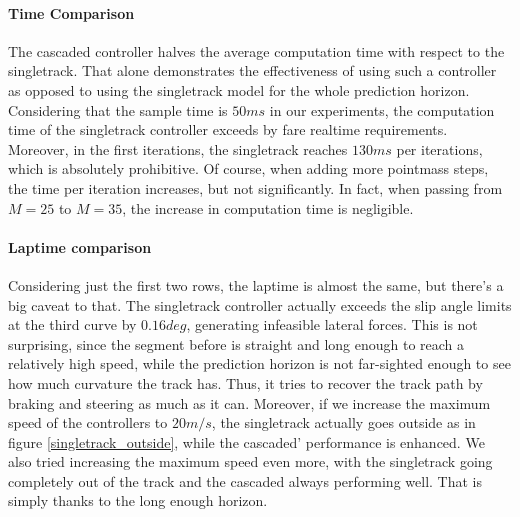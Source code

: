 \documentclass[a4paper, onecolumn, 12pt]{article}
\begin{document}
\paragraph{Time Comparison}
The cascaded controller halves the average computation time with respect to the
singletrack. That alone demonstrates the effectiveness of using such a
controller as opposed to using the singletrack model for the whole prediction
horizon. Considering that the sample time is $50ms$ in our experiments, the
computation time of the singletrack controller exceeds by fare realtime
requirements. Moreover, in the first iterations, the singletrack reaches $130ms$
per iterations, which is absolutely prohibitive. Of course, when adding more
pointmass steps, the time per iteration increases, but not significantly. In
fact, when passing from $M=25$ to $M=35$, the increase in computation time is
negligible.

\paragraph{Laptime comparison}
Considering just the first two rows, the laptime is almost the same, but there's
a big caveat to that. The singletrack controller actually exceeds the slip angle
limits at the third curve by $0.16 deg$, generating infeasible lateral forces.
This is not surprising, since the segment before is straight and long enough to
reach a relatively high speed, while the prediction horizon is not far-sighted
enough to see how much curvature the track has. Thus, it tries to recover the
track path by braking and steering as much as it can. Moreover, if we increase
the maximum speed of the controllers to $20 m/s$, the singletrack actually goes
outside as in figure \ref{singletrack_outside}, while the cascaded' performance
is enhanced. We also tried increasing the maximum speed even more, with the
singletrack going completely out of the track and the cascaded always performing
well. That is simply thanks to the long enough horizon.
\end{document}
